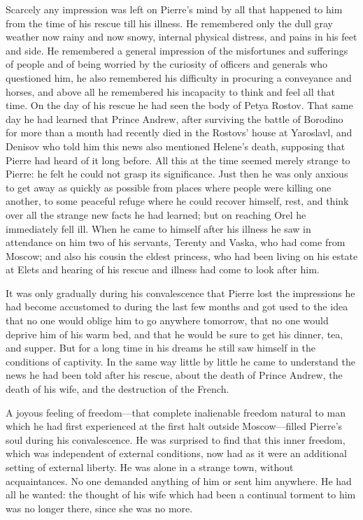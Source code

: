 Scarcely any impression was left on Pierre's mind by all that
happened to him from the time of his rescue till his illness. He
remembered only the dull gray weather now rainy and now snowy,
internal physical distress, and pains in his feet and side. He
remembered a general impression of the misfortunes and sufferings
of people and of being worried by the curiosity of officers and
generals who questioned him, he also remembered his difficulty in
procuring a conveyance and horses, and above all he remembered
his incapacity to think and feel all that time.  On the day of
his rescue he had seen the body of Petya Rostov. That same day he
had learned that Prince Andrew, after surviving the battle of
Borodino for more than a month had recently died in the Rostovs'
house at Yaroslavl, and Denisov who told him this news also
mentioned Helene's death, supposing that Pierre had heard of it
long before. All this at the time seemed merely strange to
Pierre: he felt he could not grasp its significance. Just then he
was only anxious to get away as quickly as possible from places
where people were killing one another, to some peaceful refuge
where he could recover himself, rest, and think over all the
strange new facts he had learned; but on reaching Orel he
immediately fell ill. When he came to himself after his illness
he saw in attendance on him two of his servants, Terenty and
Vaska, who had come from Moscow; and also his cousin the eldest
princess, who had been living on his estate at Elets and hearing
of his rescue and illness had come to look after him.

It was only gradually during his convalescence that Pierre lost
the impressions he had become accustomed to during the last few
months and got used to the idea that no one would oblige him to
go anywhere tomorrow, that no one would deprive him of his warm
bed, and that he would be sure to get his dinner, tea, and
supper. But for a long time in his dreams he still saw himself in
the conditions of captivity. In the same way little by little he
came to understand the news he had been told after his rescue,
about the death of Prince Andrew, the death of his wife, and the
destruction of the French.

A joyous feeling of freedom---that complete inalienable freedom
natural to man which he had first experienced at the first halt
outside Moscow---filled Pierre's soul during his
convalescence. He was surprised to find that this inner freedom,
which was independent of external conditions, now had as it were
an additional setting of external liberty. He was alone in a
strange town, without acquaintances. No one demanded anything of
him or sent him anywhere. He had all he wanted: the thought of
his wife which had been a continual torment to him was no longer
there, since she was no more.

